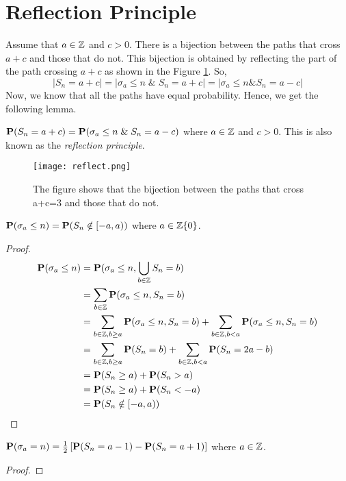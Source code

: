 \documentclass[main]{subfiles}
\begin{document}
\section{Reflection Principle}
Assume that $a \in \Z$ and $c>0$. There is a bijection between the paths that cross $a+c$ and those that do not. This bijection is obtained by reflecting the part of the path crossing $a+c$ as shown in the Figure \ref{fig:reflect}. So,
$$\left|S_n=a+c\right|=\left|\sigma_a\leq n \; \& \; S_n=a+c \right|=\left|\sigma_a\leq n \& S_n=a-c \right|$$
Now, we know that all the paths have equal probability. Hence, we get the following lemma.
\begin{lemma}
    $\P(S_n=a+c)=\P(\sigma_a\leq n \; \& \; S_n=a-c)$ where $a \in \Z$ and $c>0$. This is also known as the \emph{reflection principle}.
    \label{lem:reflect}
\end{lemma}
\begin{figure}[ht]
    \label{fig:reflect}
    \centering
    \texttt{[image: reflect.png]}
    \caption{The figure shows that the bijection between the paths that cross a+c=3 and those that do not.}
\end{figure}
\begin{theorem}
    $\P(\sigma_a\leq n)=\P(S_n\notin [-a,a))$ where $a \in \Z \\ \{0\}$.
\end{theorem}
\begin{proof}
    $$
        \begin{aligned}
            \P(\sigma_a\leq n) & =\P(\sigma_a\leq n, \bigcup_{b \in \Z}{S_n=b} )                                                      \\
                               & =\sum_{b \in \Z} \P(\sigma_a\leq n, S_n=b)                                                           \\
                               & =\sum_{b \in \Z, b\geq a} \P(\sigma_a\leq n, S_n=b)+ \sum_{b \in \Z, b< a} \P(\sigma_a\leq n, S_n=b) \\
                               & =\sum_{b \in \Z, b\geq a} \P(S_n=b)+ \sum_{b \in \Z, b< a} \P(S_n=2a-b)                              \\
                               & =\P(S_n\geq a) + \P(S_n >a)                                                                          \\
                               & =\P(S_n\geq a) + \P(S_n <-a)                                                                         \\
                               & =\P(S_n\notin [-a,a))
        \end{aligned}
    $$
\end{proof}
\begin{corollary}
    $\P(\sigma_a=n)=\frac{1}{2}\left[\P(S_n=a-1)-\P(S_n=a+1)\right]$ where $a \in \Z$.
\end{corollary}
\begin{proof}

\end{proof}
\end{document}
